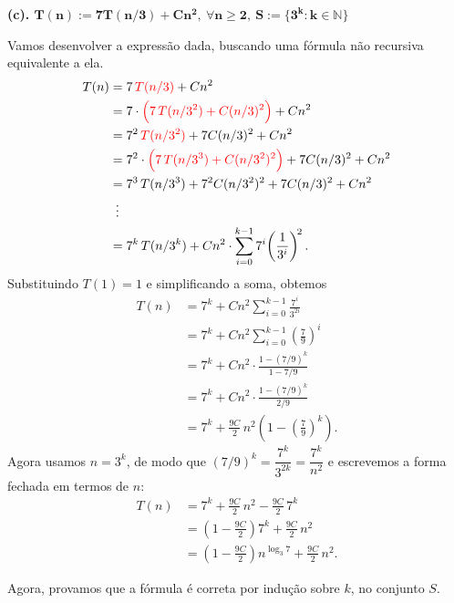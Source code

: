 \documentclass[a4paper]{article}
\begin{document}
\newpage

\textbf{(c). $\bm{T(n) := 7T(n/3) + Cn^2, \: \forall n \ge 2, \: S:= \{ 3^k : k \in \mathbb N \}}$}

Vamos desenvolver a expressão dada, buscando uma fórmula não recursiva equivalente a ela.
\begin{align*}
    T(n) & = 7 \, \color{red} T(n/3) \color{black} + Cn^2 \\
    & = 7 \cdot \color{red} \Big( 7 \, T(n/3^2) + C(n/3)^2 \Big) \color{black} + Cn^2 \\
    & = 7^2 \, \color{red} T(n/3^2) \color{black} + 7C(n/3)^2 + Cn^2 \\
    & = 7^2 \cdot \color{red} \Big( 7 \, T(n/3^3) + C(n/3^2)^2 \Big) \color{black} + 7C(n/3)^2 + Cn^2 \\
    & = 7^3 \, T(n/3^3) + 7^2C(n/3^2)^2 + 7C(n/3)^2 + Cn^2 \\
    & \: \; \vdots \\
    & = 7^k \, T(n/3^k) + Cn^2 \cdot \sum_{i=0}^{k-1} 7^i \!\left(\frac 1{3^i}\right)^{\!2}.
\end{align*}
Substituindo $T(1)=1$ e simplificando a soma, obtemos
\begin{align*}
    T(n)
    &= 7^k + Cn^2 \sum_{i=0}^{k-1} \frac{7^i}{3^{2i}} \\
    &= 7^k + Cn^2 \sum_{i=0}^{k-1} \left(\frac{7}{9}\right)^i \\
    &= 7^k + Cn^2 \cdot \frac{1-(7/9)^k}{1-7/9} \\
    &= 7^k + Cn^2 \cdot \frac{1-(7/9)^k}{2/9} \\
    &= 7^k + \frac{9C}{2}\,n^2\!\left(1-\left(\frac{7}{9}\right)^k\right).
\end{align*}
Agora usamos $n=3^k$, de modo que $(7/9)^k = \dfrac{7^k}{3^{2k}} = \dfrac{7^k}{n^2}$ e escrevemos a forma fechada em termos de \(n\):
\begin{align*}
    T(n)
    &= 7^k + \frac{9C}{2}\,n^2 - \frac{9C}{2}\,7^k \\
    &= \left(1-\frac{9C}{2}\right)7^k + \frac{9C}{2}\,n^2 \\
    &= \left(1-\frac{9C}{2}\right)n^{\log_3 7} + \frac{9C}{2}\,n^2.
\end{align*}

Agora, provamos que a fórmula é correta por indução sobre $k$, no conjunto $S$.
\end{document}
